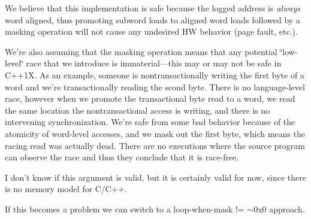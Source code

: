 We believe that this implementation is safe because the logged address is {\itshape always} word aligned, thus promoting subword loads to aligned word loads followed by a masking operation will not cause any undesired H\-W behavior (page fault, etc.).

We're also assuming that the masking operation means that any potential \char`\"{}low-\/level\char`\"{} race that we introduce is immaterial---this may or may not be safe in C++1\-X. As an example, someone is nontransactionally writing the first byte of a word and we're transactionally reading the scond byte. There is no language-\/level race, however when we promote the transactional byte read to a word, we read the same location the nontransactional access is writing, and there is no intervening synchronization. We're safe from some bad behavior because of the atomicity of word-\/level accesses, and we mask out the first byte, which means the racing read was actually dead. There are no executions where the source program can observe the race and thus they conclude that it is race-\/free.

I don't know if this argument is valid, but it is certainly valid for now, since there is no memory model for C/\-C++.

If this becomes a problem we can switch to a loop-\/when-\/mask != $\sim$0x0 approach. 

